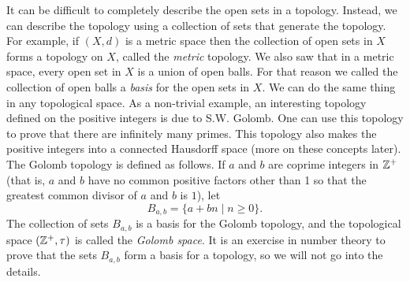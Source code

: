 \begin{comment}

\ActivitySolution 

\ba

\item By definition, $\emptyset \in \tau_{FC}$. Since $X \setminus X = \emptyset$ is finite, $X \in \tau_{FC}$. Let $\{O_{\alpha}\}$ be a collection of open sets in $X$ for $\alpha$ in an indexing set $I$. Since $X \setminus O_{\alpha}$ is finite for each $\alpha \in I$, we have that 
\[X \setminus \bigcup_{\alpha \in I} O_{\alpha} = \bigcap_{\alpha \in I} (X \setminus O_{\alpha}) \subseteq (X \setminus O_{\beta}\]
for any $\beta \in I$ is a finite set. Thus, $\bigcup_{\alpha \in I} O_{\alpha} \in \tau_{FC}$. 

Now suppose that $I$ is finite. Then
\[X \setminus \bigcap_{\alpha \in I} O_{\alpha} = \bigcup_{\alpha \in I} (X \setminus O_{\alpha})\]
is a finite union of finite sets and so is finite. Thus, $\bigcap_{\alpha \in I} O_{\alpha} \in \tau_{FC}$. We conclude that $\tau_{FC}$ is a topology. 

\item Suppose $X$ is finite. Then $X \setminus O$ is finite for every subset $O$ of $X$. Thus, every subset of $X$ is open and so $\tau_{FC}$ is the discrete topology.

\ea


\end{comment}


It can be difficult to completely describe the open sets in a topology. Instead, we can describe the topology using a collection of sets that generate the topology. For example, if $(X,d)$ is a metric space then the collection of open sets in $X$ forms a topology on $X$, called the \emph{metric}  topology. We also saw that in a metric space, every open set in $X$ is a union of open balls. For that reason we called the collection of open balls a \emph{basis} for the open sets in $X$. We can do the same thing in any topological space. As a non-trivial example, an interesting topology defined on the positive integers is due to S.W. Golomb.  One can use this topology to prove that there are infinitely many primes. This topology also makes the positive integers into a connected Hausdorff space (more on these concepts later). The Golomb topology is defined as follows. If $a$ and $b$ are coprime integers in $\mathbb{Z}^+$ (that is, $a$ and $b$ have no common positive factors other than 1 so that the greatest common divisor of $a$ and $b$ is $1$), let 
\[B_{a,b} = \{a+bn \mid n \geq 0\}.\]
The collection of sets $B_{a,b}$ is a basis for the Golomb topology, and the topological space $(\mathbb{Z}^+, \tau)$ is called the \emph{Golomb space}. It is an exercise in number theory to prove that the sets $B_{a,b}$ form a basis for a topology, so we will not go into the details. 

